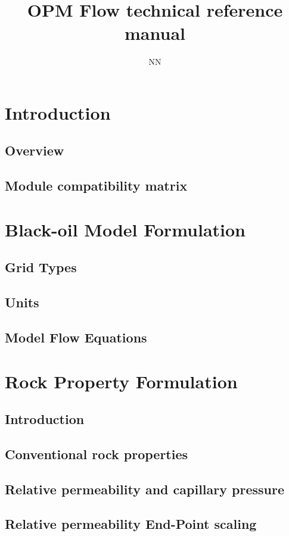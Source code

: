 \documentclass{elsarticle}
\title{OPM Flow technical reference manual}
\author{NN}
\begin{document}
\maketitle

\section{Introduction}
\subsection{Overview}
\subsection{Module compatibility matrix}

\section{Black-oil Model Formulation}
\subsection{Grid Types}
\subsection{Units}
\subsection{Model Flow Equations}

\section{Rock Property Formulation}
\subsection{Introduction}
\subsection{Conventional rock properties}
\subsection{Relative permeability and capillary pressure}
\subsection{Relative permeability End-Point scaling}
\end{document}
